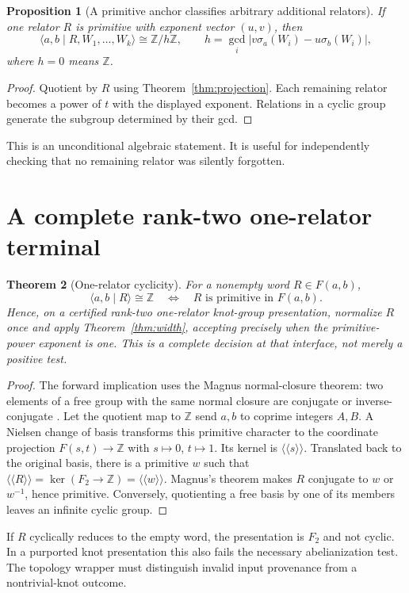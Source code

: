 \documentclass[11pt,letterpaper]{article}
\newtheorem{theorem}{Theorem}[section]
\newtheorem{proposition}[theorem]{Proposition}
\theoremstyle{definition}
\newcommand{\Z}{\mathbb Z}
\newcommand{\nc}[1]{\langle\!\langle #1\rangle\!\rangle}
\begin{document}
\begin{proposition}[A primitive anchor classifies arbitrary additional relators]
\label{prop:anchor}
If one relator $R$ is primitive with exponent vector $(u,v)$, then
\[
 \langle a,b\mid R,W_1,\ldots,W_k\rangle
 \cong \Z/h\Z,\qquad
 h=\gcd_i\bigl|v\sigma_a(W_i)-u\sigma_b(W_i)\bigr|,
\]
where $h=0$ means $\Z$.
\end{proposition}
\begin{proof}
Quotient by $R$ using Theorem~\ref{thm:projection}. Each remaining relator
becomes a power of $t$ with the displayed exponent. Relations in a cyclic
group generate the subgroup determined by their gcd.
\end{proof}
This is an unconditional algebraic statement. It is useful for independently
checking that no remaining relator was silently forgotten.

\section{A complete rank-two one-relator terminal}
\label{sec:onereletor}
\begin{theorem}[One-relator cyclicity]
\label{thm:onereletor}
For a nonempty word $R\in F(a,b)$,
\[
 \langle a,b\mid R\rangle\cong\Z
 \quad\Longleftrightarrow\quad R\text{ is primitive in }F(a,b).
\]
Hence, on a certified rank-two one-relator knot-group presentation, normalize
$R$ once and apply Theorem~\ref{thm:width}, accepting precisely when the
primitive-power exponent is one. This is a complete decision at that
interface, not merely a positive test.
\end{theorem}
\begin{proof}
The forward implication uses the Magnus normal-closure theorem: two elements
of a free group with the same normal closure are conjugate or
inverse-conjugate \cite{Magnus,Howie}. Let the quotient map to $\Z$ send
$a,b$ to coprime integers $A,B$. A Nielsen change of basis transforms this
primitive character to the coordinate projection $F(s,t)\to\Z$ with
$s\mapsto0$, $t\mapsto1$. Its kernel is $\nc{s}$. Translated back to the
original basis, there is a primitive $w$ such that
$\nc{R}=\ker(F_2\to\Z)=\nc{w}$. Magnus's theorem makes $R$ conjugate to
$w$ or $w^{-1}$, hence primitive. Conversely, quotienting a free basis by
one of its members leaves an infinite cyclic group.
\end{proof}

If $R$ cyclically reduces to the empty word, the presentation is $F_2$ and
not cyclic. In a purported knot presentation this also fails the necessary
abelianization test. The topology wrapper must distinguish invalid input
provenance from a nontrivial-knot outcome.
\end{document}
